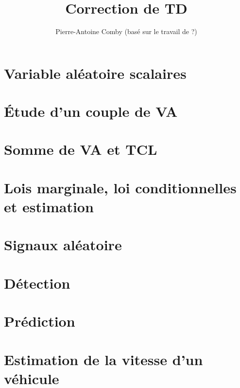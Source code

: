 \documentclass{../../td}
\title{Correction de TD}
\author{Pierre-Antoine Comby (basé sur le travail de ?)}
\begin{document}
\maketitle
\tableofcontents
\section{Variable aléatoire scalaires}

\section{Étude d'un couple de VA}

\section{Somme de VA et TCL}

\section{Lois marginale, loi conditionnelles et estimation}

\section{Signaux aléatoire}

\section{Détection}

\section{Prédiction}

\section{Estimation de la vitesse d'un véhicule}

\end{document}
